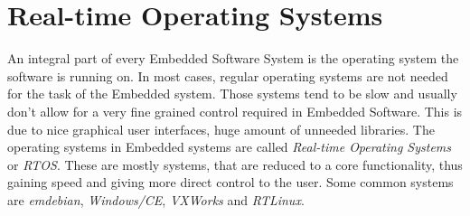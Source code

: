 \documentclass[10pt,a4paper,titlepage,draft]{article} %
\begin{document}
\section{Real-time Operating Systems}
An integral part of every Embedded Software System is the operating system the software is running on.
In most cases, regular operating systems are not needed for the task of the Embedded system.
Those systems tend to be slow and usually don't allow for a very fine grained control required in Embedded Software.
This is due to nice graphical user interfaces, huge amount of unneeded libraries.
The operating systems in Embedded systems are called \emph{Real-time Operating Systems} or \emph{RTOS}.
These are mostly systems, that are reduced to a core functionality, thus gaining speed and giving more direct control to the user.
Some common systems are \emph{emdebian}, \emph{Windows/CE}, \emph{VXWorks} and \emph{RTLinux}.
\end{document}
